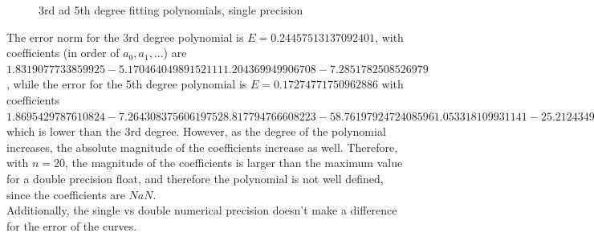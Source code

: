 \documentclass{article}
\begin{document}
\begin{figure}[H]
    \centering
    \qquad
    \caption{3rd ad 5th degree fitting polynomials, single precision}%
\end{figure}

The error norm for the 3rd degree polynomial is $E=0.24457513137092401$, with coefficients (in order of $a_0, a_1,...$) are $1.8319077733859925       -5.1704640498915211        11.204369949906708       -7.2851782508526979$, while the error for the 5th degree polynomial is $E=0.17274771750962886$ with coefficients $1.8695429787610824       -7.2643083756061975        28.817794766608223       -58.761979247240859        61.053318109931141       -25.212434983094763$ which is lower than the 3rd degree. However, as the degree of the polynomial increases, the absolute magnitude of the coefficients increase as well. Therefore, with $n=20$, the magnitude of the coefficients is larger than the maximum value for a double precision float, and therefore the polynomial is not well defined, since the coefficients are $NaN$. \\

Additionally, the single vs double numerical precision doesn't make a difference for the error of the curves. \\
\end{document}
